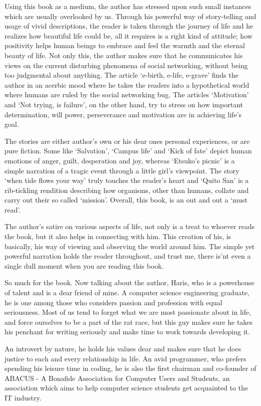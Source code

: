 \documentclass[twoside,11pt,titlepage]{article}
\begin{document}
Using this book as a medium, the author has stressed upon such small instances which are usually overlooked by us. Through his powerful way of story-telling and usage of vivid descriptions, the reader is taken through the journey of life and he realizes how beautiful life could be, all it requires is a right kind of attitude; how positivity helps human beings to embrace and feel the warmth and the eternal beauty of life. Not only this, the author makes sure that he communicates his views on the current disturbing phenomena of social networking, without being too judgmental about anything. The article `e-birth, e-life, e-grave' finds the author in an acerbic mood where he takes the readers into a hypothetical world where humans are ruled by the social networking bug. The articles `Motivation' and `Not trying, is failure', on the other hand, try to stress on how important determination, will power, perseverance and motivation are in achieving life's goal.

The stories are either author's own or his dear ones personal experiences, or are pure fiction. Some like `Salvation', `Campus life' and `Kick of fate' depict human emotions of anger, guilt, desperation and joy, whereas `Etsuko's picnic' is a simple narration of a tragic event through a little girl's viewpoint. The story `when tide flows your way' truly touches the reader's heart and `Quito San' is a rib-tickling rendition describing how organisms, other than humans, collate and carry out their so called `mission'. Overall, this book, is an out and out a `must read'.

The author's satire on various aspects of life, not only is a treat to whoever reads the book, but it also helps in connecting with him. This creation of his, is basically, his way of viewing and observing the world around him. The simple yet powerful narration holds the reader throughout, and trust me, there is'nt even a single dull moment when you are reading this book. 

So much for the book. Now talking about the author, Haris, who is a powerhouse of talent and is a dear friend of mine. A computer science engineering graduate, he is one among those who considers passion and profession with equal seriousness. Most of us tend to forget what we are most passionate about in life, and force ourselves to be a part of the rat race, but this guy makes sure he takes his penchant for writing seriously and make time to work towards developing it.

An introvert by nature, he holds his values dear and makes sure that he does justice to each and every relationship in life. An avid programmer, who prefers spending his leisure time in coding, he is also the first chairman and co-founder of ABACUS - A Bonafide Association for Computer Users and Students, an association which aims to help computer science students get acquainted to the IT industry.
\end{document}
